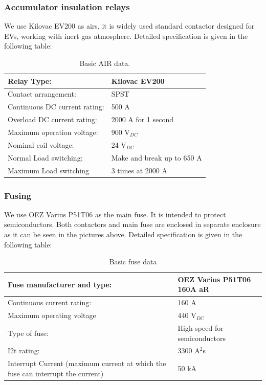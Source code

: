 \subsubsection{Accumulator insulation relays}\label{subsec:airs}

We use Kilovac EV200 as \glspl{air}, it is widely used standard contactor designed for EVs, working with inert gas atmosphere. Detailed specification is given in the following table:

\begin{table}[H]
	\centering
	\caption{Basic AIR data.}
	\begin{tabu}{|X|X|}
		\hline
		Relay Type: & Kilovac EV200 \\
		\hline
		Contact arrangement: & SPST \\
		\hline
		Continuous DC current rating: & 500 A \\
		\hline
		Overload DC current rating:  & 2000 A for 1 second \\
		\hline
		Maximum operation voltage: & 900 V$_{DC}$ \\
		\hline
		Nominal coil voltage: & 24 V$_{DC}$ \\
		\hline
		Normal Load switching: & Make and break up to 650 A \\
		\hline
		Maximum Load switching & 3 times at 2000 A \\
		\hline
	\end{tabu}%
	\label{tab:acc-air}%
\end{table}%

\subsubsection{Fusing}

We use OEZ Varius P51T06 as the main fuse. It is intended to protect semiconductors. Both contactors and main fuse are enclosed in separate enclosure as it can be seen in the pictures above. Detailed specification is given in the following table:

\begin{table}[H]
	\centering
	\caption{Basic fuse data}
	\begin{tabu}{|X|X|}
		\hline
		Fuse manufacturer and type: & OEZ Varius P51T06 160A aR \\
		\hline
		Continuous current rating:  & 160 A \\
		\hline
		Maximum operating voltage  & 440 V$_{DC}$ \\
		\hline
		Type of fuse: & High speed for semiconductors \\
		\hline
		I2t rating: & 3300 A$^{2}$s \\
		\hline
		Interrupt Current (maximum current at which the fuse can interrupt the current) & 50 kA \\
		\hline
	\end{tabu}%
	\label{tab:acc-fuse}%
\end{table}%

